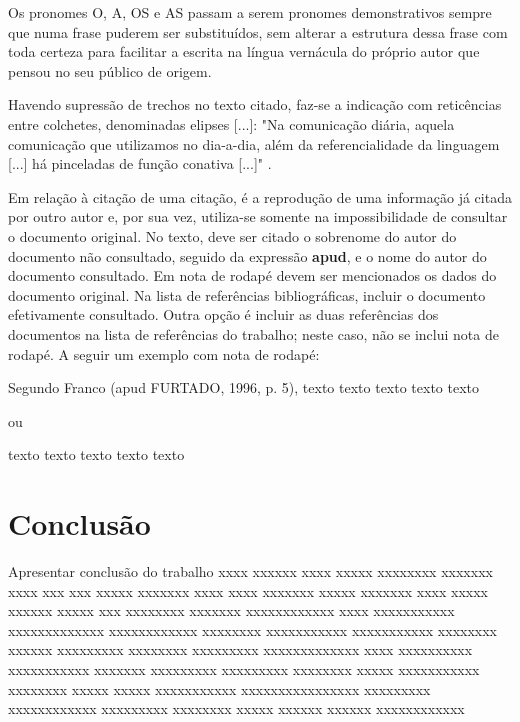 \documentclass[
	oneside,
	english,brazil,
	mestrado,ppgc]{infufrgs}
\begin{document}
\begin{citacao}
    Os pronomes O, A, OS e AS passam a serem pronomes demonstrativos sempre que
    numa frase puderem ser substituídos, sem alterar a estrutura dessa frase
    com toda certeza para facilitar a escrita na língua vernácula do próprio
    autor que pensou no seu público de origem. \cite[p.~19]{simoes}
\end{citacao}

Havendo supressão de trechos no texto citado, faz-se a indicação com
reticências entre colchetes, denominadas elipses [...]: "Na comunicação diária,
aquela comunicação que utilizamos no dia-a-dia, além da referencialidade da
linguagem [...] há pinceladas de função conativa [...]" \cite[p.~37]{chalhub}.

Em relação à citação de uma citação, é a reprodução de uma informação já citada
por outro autor e, por sua vez, utiliza-se somente na impossibilidade de
consultar o documento original. No texto, deve ser citado o sobrenome do autor
do documento não consultado, seguido da expressão \textbf{apud}, e o nome do
autor do documento consultado. Em nota de rodapé devem ser mencionados os dados
do documento original. Na lista de referências bibliográficas, incluir o
documento efetivamente consultado. Outra opção é incluir as duas referências
dos documentos na lista de referências do trabalho; neste caso, não se inclui
nota de rodapé. A seguir um exemplo com nota de rodapé:

Segundo Franco (apud FURTADO, 1996, p. 5), texto texto
texto texto texto 

ou

texto texto texto texto texto 

\chapter{Conclusão}
Apresentar
conclusão
do
trabalho
xxxx xxxxxx xxxx xxxxx xxxxxxxx xxxxxxx xxxx xxx xxx xxxxx xxxxxxx xxxx xxxx
xxxxxxx xxxxx xxxxxxx xxxx xxxxx xxxxxx xxxxx xxx xxxxxxxx xxxxxxx xxxxxxxxxxxx
xxxx xxxxxxxxxxx xxxxxxxxxxxxx xxxxxxxxxxxx xxxxxxxx xxxxxxxxxxx xxxxxxxxxxx
xxxxxxxx xxxxxx xxxxxxxxx xxxxxxxx xxxxxxxxx xxxxxxxxxxxxx xxxx xxxxxxxxxx
xxxxxxxxxxx xxxxxxx xxxxxxxxx xxxxxxxxx xxxxxxxx xxxxx xxxxxxxxxxx xxxxxxxx
xxxxx xxxxx xxxxxxxxxxx xxxxxxxxxxxxxxxx xxxxxxxxx xxxxxxxxxxxx xxxxxxxxx
xxxxxxxx xxxxx xxxxxx xxxxxx xxxxxxxxxxxx
\end{document}
